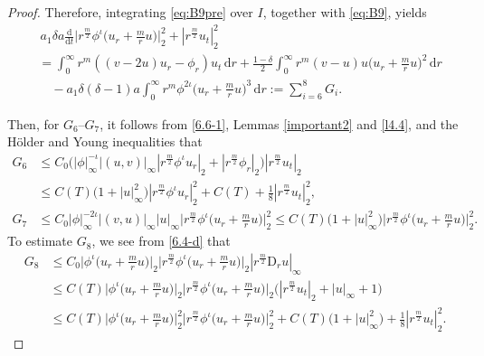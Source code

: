 \documentclass[11pt,reqno]{amsart}
\numberwithin{rk}{section}
\numberwithin{prop}{section}
\numberwithin{mydef}{section}
\numberwithin{lem}{section}
\numberwithin{equation}{section}
\numberwithin{thm}{section}
\begin{document}
\begin{proof}
Therefore, integrating \eqref{eq:B9pre} over $I$, together with \eqref{eq:B9}, yields
\begin{equation}\label{e-1.20}
\begin{aligned}
&\,a_1\delta a\frac{\mathrm{d}}{\mathrm{d}t}\Big|r^\frac{m}{2}\phi^\iota\big(u_r+\frac{m}{r}u\big)\Big|_2^2+| r^{\frac{m}{2}}u_t|_2^2\\
&= \int_0^\infty r^m ((v-2u)u_r- \phi_r )u_t\,\mathrm{d}r +\frac{1-\delta}{2} \int_0^\infty r^m (v-u)u\big(u_r+ \frac{m}{r}u\big)^2\,\mathrm{d}r\\[-2pt]
&\quad -a_1\delta(\delta-1) a \int_0^\infty r^m\phi^{2\iota}\big(u_r+ \frac{m}{r}u\big)^3\,\mathrm{d}r:=\sum_{i=6}^{8} G_i.
\end{aligned}
\end{equation}


Then, for $G_6$--$G_{7}$, it follows from \eqref{6.6-1}, Lemmas \ref{important2} and \ref{l4.4}, and the H\"older and Young inequalities that
\begin{equation}
\begin{aligned}
G_6& \leq  C_0\big(|\phi|_\infty^{-\iota}|(u,v)|_\infty|r^{\frac{m}{2}}\phi^\iota u_r|_{2}+|r^\frac{m}{2}\phi_r|_2\big)|r^{\frac{m}{2}}u_t|_{2}\\
&\leq  C(T)\big(1+|u|_\infty^2\big)|r^{\frac{m}{2}}\phi^\iota u_r|_{2}^2+C(T)+\frac{1}{8} |r^{\frac{m}{2}}u_t|_{2}^2,\\
G_7&\leq C_0|\phi|_\infty^{-2\iota}|(v,u)|_\infty|u|_\infty\Big|r^\frac{m}{2}\phi^\iota\big(u_r+\frac{m}{r}u\big)\Big|_2^2\leq C(T)\big(1+|u|_\infty^2\big)\Big|r^\frac{m}{2}\phi^\iota\big(u_r+\frac{m}{r}u\big)\Big|_2^2.    
\end{aligned}    
\end{equation}
To estimate $G_{8}$, we see from \eqref{6.4-d} that 
\begin{equation}\label{G9-G11}
\begin{aligned}
G_{8}&\leq C_0\Big|\phi^\iota\big(u_r+\frac{m}{r}u\big)\Big|_2\Big|r^\frac{m}{2}\phi^\iota\big(u_r+\frac{m}{r}u\big)\Big|_2 |r^\frac{m}{2}\mathrm{D}_r u|_\infty\\
&\leq C(T)\Big|\phi^\iota\big(u_r+\frac{m}{r}u\big)\Big|_2\Big|r^\frac{m}{2}\phi^\iota\big(u_r+\frac{m}{r}u\big)\Big|_2\big(|r^\frac{m}{2}u_t|_2+|u|_\infty+1\big)\\
&\leq C(T)\Big|\phi^\iota\big(u_r+\frac{m}{r}u\big)\Big|_2^2\Big|r^\frac{m}{2}\phi^\iota\big(u_r+\frac{m}{r}u\big)\Big|_2^2+C(T)\big(1+|u|_\infty^2\big)+\frac{1}{8}|r^\frac{m}{2}u_t|_2^2.
\end{aligned}
\end{equation}


\end{proof}
\end{document}

